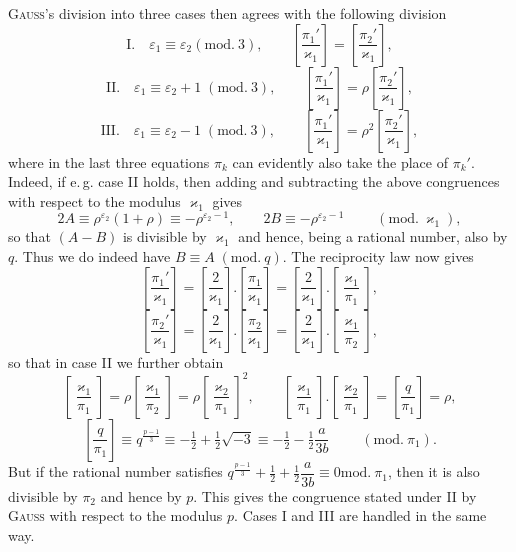 \noindent \textsc{Gauss}'s division into three cases then agrees with the following division
\[
\text{I.}\quad \varepsilon_1\equiv \varepsilon_2 (\mathrm{mod.}\ 3),\qquad \left[\dfrac{\pi_1'}{\varkappa_1}\right]=\left[\dfrac{\pi_2'}{\varkappa_1}\right],
\]
\[
\text{II.}\quad \varepsilon_1\equiv \varepsilon_2+1\;(\mathrm{mod.}\ 3),\qquad \left[\dfrac{\pi_1'}{\varkappa_1}\right]=\rho\left[\dfrac{\pi_2'}{\varkappa_1}\right],
\]
\[
\text{III.}\quad \varepsilon_1\equiv \varepsilon_2-1\;(\mathrm{mod.}\ 3),\qquad \left[\dfrac{\pi_1'}{\varkappa_1}\right]=\rho^2\left[\dfrac{\pi_2'}{\varkappa_1}\right],
\]
where in the last three equations $\pi_k$ can evidently also take the place of $\pi_k'$. Indeed, if e.\,g.
case II holds, then adding and subtracting the above congruences with respect to the modulus $\varkappa_1$ gives
\[
2A\equiv \rho^{\varepsilon_2}(1+\rho)\equiv -\rho^{\varepsilon_2-1},\qquad 2B\equiv -\rho^{\varepsilon_2-1}\qquad\;(\mathrm{mod.}\ \varkappa_1),
\]
so that $(A-B)$ is divisible by $\varkappa_1$ and hence, being a rational number, also by $q$. Thus we do indeed have $B\equiv A\;(\mathrm{mod.}\ q)$. The reciprocity law now gives
\[
\left[\dfrac{\pi_1'}{\varkappa_1}\right]=\left[\dfrac{2}{\varkappa_1}\right].\left[\dfrac{\pi_1}{\varkappa_1}\right]=\left[\dfrac{2}{\varkappa_1}\right].\left[\dfrac{\varkappa_1}{\pi_1}\right],
\]
\[
\left[\dfrac{\pi_2'}{\varkappa_1}\right]=\left[\dfrac{2}{\varkappa_1}\right].\left[\dfrac{\pi_2}{\varkappa_1}\right]=\left[\dfrac{2}{\varkappa_1}\right].\left[\dfrac{\varkappa_1}{\pi_2}\right],
\]
so that in case II we further obtain
\[
\left[\dfrac{\varkappa_1}{\pi_1}\right]=\rho\left[\dfrac{\varkappa_1}{\pi_2}\right]=\rho\left[\dfrac{\varkappa_2}{\pi_1}\right]^2,\qquad
\left[\dfrac{\varkappa_1}{\pi_1}\right].\left[\dfrac{\varkappa_2}{\pi_1}\right]=\left[\dfrac{q}{\pi_1}\right]=\rho,
\]
\[
\left[\dfrac{q}{\pi_1}\right]\equiv q^{\frac{p-1}{3}}\equiv -\tfrac12+\tfrac12\sqrt{-3}\equiv -\tfrac12-\tfrac12\dfrac{a}{3b}\qquad\;(\mathrm{mod.}\ \pi_1).
\]
But if the rational number satisfies $q^{\frac{p-1}{3}}+\tfrac12+\tfrac12\dfrac{a}{3b}\equiv 0 \mathrm{mod.}\ \pi_1$, then it is also divisible by $\pi_2$ and hence by $p$.
This gives the congruence stated under II by \textsc{Gauss} with respect to the modulus $p$.
Cases I and III are handled in the same way.
